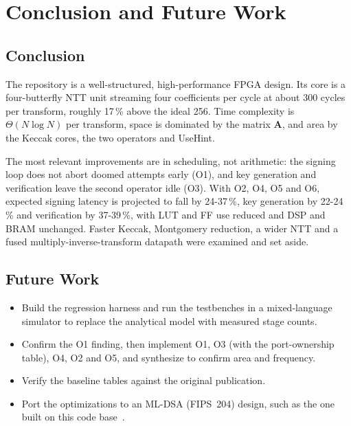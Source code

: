 \documentclass[12pt,a4paper]{report}
\begin{document}
\chapter{Conclusion and Future Work}
\section{Conclusion}
The repository is a well-structured, high-performance FPGA design. Its core is a four-butterfly NTT unit streaming four coefficients per cycle at about 300 cycles per transform, roughly 17\,\% above the ideal 256. Time complexity is $\Theta(N\log N)$ per transform, space is dominated by the matrix $\mathbf{A}$, and area by the Keccak cores, the two operators and UseHint.

The most relevant improvements are in scheduling, not arithmetic: the signing loop does not abort doomed attempts early (O1), and key generation and verification leave the second operator idle (O3). With O2, O4, O5 and O6, expected signing latency is projected to fall by 24-37\,\%, key generation by 22-24\,\% and verification by 37-39\,\%, with LUT and FF use reduced and DSP and BRAM unchanged. Faster Keccak, Montgomery reduction, a wider NTT and a fused multiply-inverse-transform datapath were examined and set aside.

\section{Future Work}
\begin{itemize}
  \item Build the regression harness and run the testbenches in a mixed-language simulator to replace the analytical model with measured stage counts.
  \item Confirm the O1 finding, then implement O1, O3 (with the port-ownership table), O4, O2 and O5, and synthesize to confirm area and frequency.
  \item Verify the baseline tables against the original publication.
  \item Port the optimizations to an ML-DSA (FIPS~204) design, such as the one built on this code base~\cite{norga2026}.
\end{itemize}
\end{document}
